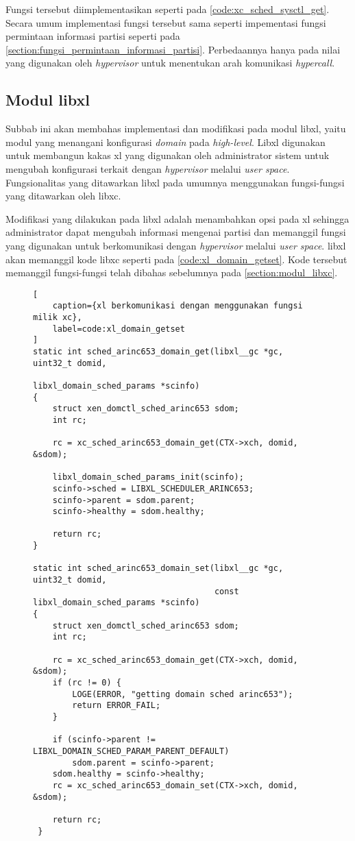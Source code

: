 Fungsi tersebut diimplementasikan seperti pada \autoref{code:xc_sched_sysctl_get}. Secara umum
implementasi fungsi tersebut sama seperti impementasi fungsi permintaan informasi partisi
seperti pada \autoref{section:fungsi_permintaan_informasi_partisi}. Perbedaannya hanya pada
nilai yang digunakan oleh \textit{hypervisor} untuk menentukan arah komunikasi
\textit{hypercall}.

\subsection{Modul libxl}
\label{section:modul_libxl}

Subbab ini akan membahas implementasi dan modifikasi pada modul libxl, yaitu modul yang
menangani konfigurasi \textit{domain} pada \textit{high-level}. Libxl digunakan untuk membangun
kakas xl yang digunakan oleh administrator sistem untuk mengubah konfigurasi terkait dengan
\textit{hypervisor} melalui \textit{user space}. Fungsionalitas yang ditawarkan libxl pada
umumnya menggunakan fungsi-fungsi yang ditawarkan oleh libxc.

Modifikasi yang dilakukan pada libxl adalah menambahkan opsi pada xl sehingga administrator
dapat mengubah informasi mengenai partisi dan memanggil fungsi yang digunakan untuk
berkomunikasi dengan \textit{hypervisor} melalui \textit{user space}. libxl akan memanggil kode
libxc seperti pada \autoref{code:xl_domain_getset}. Kode tersebut memanggil fungsi-fungsi telah
dibahas sebelumnya pada \autoref{section:modul_libxc}.

\begin{figure}[!h]
\begin{lstlisting}[
	caption={xl berkomunikasi dengan menggunakan fungsi milik xc},
	label=code:xl_domain_getset
]
static int sched_arinc653_domain_get(libxl__gc *gc, uint32_t domid,
                                   libxl_domain_sched_params *scinfo)
{
    struct xen_domctl_sched_arinc653 sdom;
    int rc;

    rc = xc_sched_arinc653_domain_get(CTX->xch, domid, &sdom);

    libxl_domain_sched_params_init(scinfo);
    scinfo->sched = LIBXL_SCHEDULER_ARINC653;
    scinfo->parent = sdom.parent;
    scinfo->healthy = sdom.healthy;

    return rc;
}

static int sched_arinc653_domain_set(libxl__gc *gc, uint32_t domid,
                                     const libxl_domain_sched_params *scinfo)
{
    struct xen_domctl_sched_arinc653 sdom;
    int rc;

    rc = xc_sched_arinc653_domain_get(CTX->xch, domid, &sdom);
    if (rc != 0) {
        LOGE(ERROR, "getting domain sched arinc653");
        return ERROR_FAIL;
    }

    if (scinfo->parent != LIBXL_DOMAIN_SCHED_PARAM_PARENT_DEFAULT)
        sdom.parent = scinfo->parent;
    sdom.healthy = scinfo->healthy;
    rc = xc_sched_arinc653_domain_set(CTX->xch, domid, &sdom);

    return rc;
 }
\end{lstlisting}
\end{figure}

